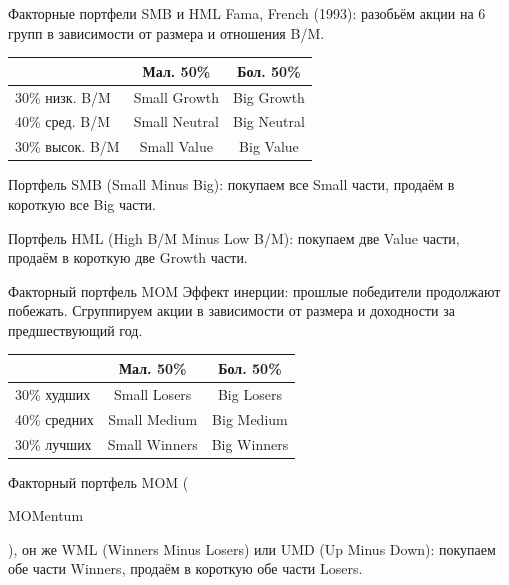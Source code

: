 \documentclass{beamer}
\newcommand{\en}[1]{\begin{otherlanguage}{english}#1\end{otherlanguage}}
\begin{document}
\begin{frame}{Факторные портфели SMB и HML}
\justify
Fama, French (1993): разобьём акции на 6 групп в зависимости от размера и 
отношения B/M.

\justify
\centering
\begin{tabular}{l|c|c}
                & Мал. 50\%     & Бол. 50\% \\ \hline
30\% низк. B/M  & Small Growth  & Big Growth \\
40\% сред. B/M  & Small Neutral & Big Neutral \\
30\% высок. B/M & Small Value   & Big Value
\end{tabular}

\justify
Портфель SMB (Small Minus Big): покупаем все Small части, продаём в короткую
все Big части.

\justify
Портфель HML (High B/M Minus Low B/M): покупаем две Value части, продаём в 
короткую две Growth части.
\end{frame}



\begin{frame}{Факторный портфель MOM}
\justify
Эффект инерции: прошлые победители продолжают побежать. Сгруппируем акции в 
зависимости от размера и доходности за предшествующий год.

\justify
\centering
\begin{tabular}{l|c|c}
             & Мал. 50\%     & Бол. 50\% \\ \hline
30\% худших  & Small Losers  & Big Losers \\
40\% средних & Small Medium  & Big Medium \\
30\% лучших  & Small Winners & Big Winners
\end{tabular}

\justify
Факторный портфель MOM (\en{MOMentum}), он же WML (Winners Minus Losers) или
UMD (Up Minus Down): покупаем обе части Winners, продаём в короткую обе части
Losers.
\end{frame}



    \newcommand{\addFactorPlot}[3]{
        \addplot[
            color=#2,
            mark=#3,
            line width=1pt,
            mark repeat=120,
            mark phase=36,
            mark options={scale=2}
        ]
        table [
            x = date,
            y = #1,
            col sep=comma
        ]
        {data/fama_french_cumulative_growth_data.csv};
    }
    
\end{document}
